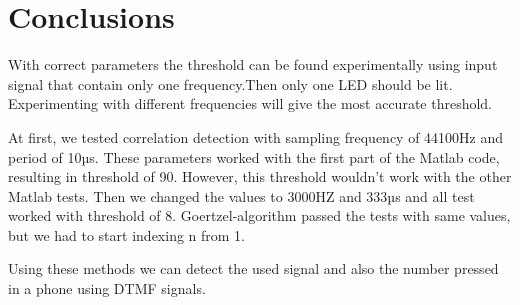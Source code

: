 \section{Conclusions}
With correct parameters the threshold can be found experimentally using input signal that contain only one frequency.Then only one LED should be lit. Experimenting with different frequencies will give the most accurate threshold.

At first, we tested correlation detection with sampling frequency of 44100Hz and period of 10µs. These parameters worked  with the first part of the Matlab code, resulting in threshold of 90. However, this threshold wouldn't work with the other Matlab tests. Then we changed the values to 3000HZ and 333µs and all test worked with threshold of 8. Goertzel-algorithm passed the tests with same values, but we had to start indexing n from 1.

Using these methods we can detect the used signal and also the number pressed in a phone using DTMF signals.